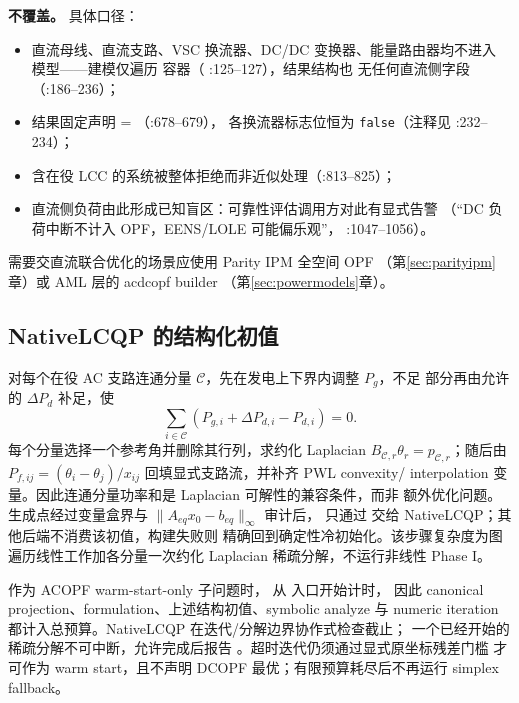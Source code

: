 \textbf{不覆盖。} 具体口径：
\begin{itemize}
  \item 直流母线、直流支路、VSC 换流器、DC/DC 变换器、能量路由器均不进入
        模型——建模仅遍历  容器（
        :125--127），结果结构也
        无任何直流侧字段
        （:186--236）；
  \item 结果固定声明 =
        （:678--679）， 各换流器标志位恒为
        \texttt{false}（注释见
        :232--234）；
  \item 含在役 LCC 的系统被整体拒绝而非近似处理（:813--825）；
  \item 直流侧负荷由此形成已知盲区：可靠性评估调用方对此有显式告警
        （“DC 负荷中断不计入 OPF，EENS/LOLE 可能偏乐观”，
        :1047--1056）。
\end{itemize}
需要交直流联合优化的场景应使用 Parity IPM 全空间 OPF
（第\ref{sec:parityipm}章）或 AML 层的 acdcopf builder
（第\ref{sec:powermodels}章）。

\subsection{NativeLCQP 的结构化初值}

对每个在役 AC 支路连通分量 $\mathcal C$，先在发电上下界内调整 $P_g$，不足
部分再由允许的 $\Delta P_d$ 补足，使
\begin{equation}
\sum_{i\in\mathcal C}(P_{g,i}+\Delta P_{d,i}-P_{d,i})=0.
\end{equation}
每个分量选择一个参考角并删除其行列，求约化 Laplacian
$B_{\mathcal C,r}\theta_r=p_{\mathcal C,r}$；随后由
$P_{f,ij}=(\theta_i-\theta_j)/x_{ij}$ 回填显式支路流，并补齐 PWL convexity/
interpolation 变量。因此连通分量功率和是 Laplacian 可解性的兼容条件，而非
额外优化问题。生成点经过变量盒界与 $\|A_{eq}x_0-b_{eq}\|_\infty$ 审计后，
只通过  交给 NativeLCQP；其他后端不消费该初值，构建失败则
精确回到确定性冷初始化。该步骤复杂度为图遍历线性工作加各分量一次约化
Laplacian 稀疏分解，不运行非线性 Phase I。

作为 ACOPF warm-start-only 子问题时，
 从  入口开始计时，
因此 canonical projection、formulation、上述结构初值、symbolic analyze 与
numeric iteration 都计入总预算。NativeLCQP 在迭代/分解边界协作式检查截止；
一个已经开始的稀疏分解不可中断，允许完成后报告
。超时迭代仍须通过显式原坐标残差门槛
才可作为 warm start，且不声明 DCOPF 最优；有限预算耗尽后不再运行 simplex
fallback。

